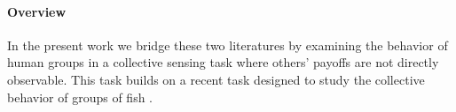 \documentclass[12pt,letterpaper]{article}
\begin{document}



\paragraph{Overview}

In the present work we bridge these two literatures by examining the behavior of human groups in a collective sensing task where others' payoffs are not directly observable.  
This task builds on a recent task designed to study the collective behavior of groups of fish \cite{berdahl_emergent_2013}.
\end{document}

